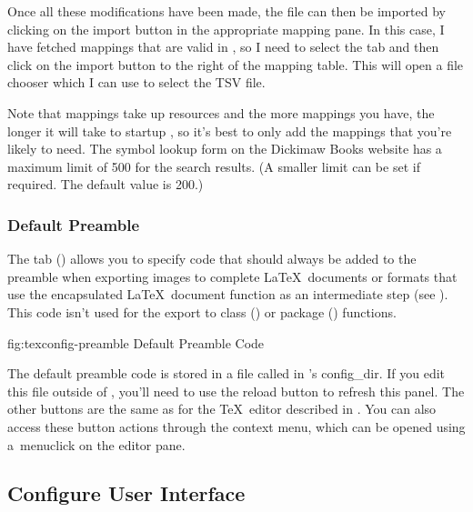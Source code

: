 Once all these modifications have been made, the file can then be
imported by clicking on the import button in the appropriate mapping
pane. In this case, I have fetched mappings that are valid in
\textmode, so I need to select the  tab
and then click on the import button to the right of the mapping
table. This will open a file chooser which I can use to select the
TSV file.

\begin{warning}
Note that mappings take up resources and the more mappings you have,
the longer it will take to startup \FlowframTk, so it's best to only
add the mappings that you're likely to need. The symbol lookup form
on the Dickimaw Books website has a maximum limit of 500 for the search
results. (A smaller limit can be set if required. The default value
is 200.)
\end{warning}

\subsubsection{Default Preamble}\label{sec:texconfigpreamble}


The  tab
() allows you to specify code that
should always be added to the preamble when exporting images to
complete \LaTeX\ documents or formats that use the encapsulated
\LaTeX\ document function as an intermediate step (see
). This code isn't used for the export to
class () or package () functions.

\FloatFig
  {fig:texconfig-preamble}
  {}
  {Default Preamble Code}

The default preamble code is stored in a file called
 in \FlowframTk's \gls{config_dir}. If you edit this
file outside of \FlowframTk, you'll need to use the reload button to
refresh this panel. The other buttons are the same as for the \TeX\
editor described in .  You can also
access these button actions through the context menu, which can be
opened using a~\gls{menuclick} on the editor pane.


\subsection{Configure User Interface}\label{sec:configureuidialog}

